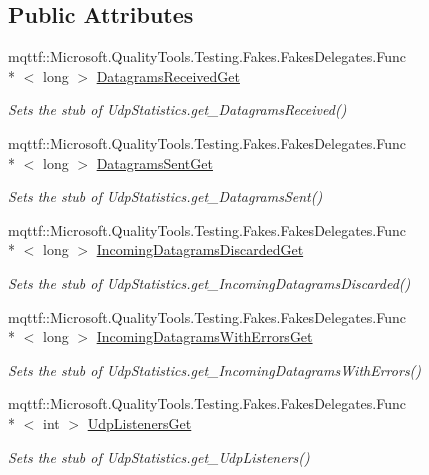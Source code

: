 \subsection*{Public Attributes}
\begin{DoxyCompactItemize}
\item 
mqttf\-::\-Microsoft.\-Quality\-Tools.\-Testing.\-Fakes.\-Fakes\-Delegates.\-Func\\*
$<$ long $>$ \hyperlink{class_system_1_1_net_1_1_network_information_1_1_fakes_1_1_stub_udp_statistics_a74cc53b521e916955921dd58c5bb31ec}{Datagrams\-Received\-Get}
\begin{DoxyCompactList}\small\item\em Sets the stub of Udp\-Statistics.\-get\-\_\-\-Datagrams\-Received()\end{DoxyCompactList}\item 
mqttf\-::\-Microsoft.\-Quality\-Tools.\-Testing.\-Fakes.\-Fakes\-Delegates.\-Func\\*
$<$ long $>$ \hyperlink{class_system_1_1_net_1_1_network_information_1_1_fakes_1_1_stub_udp_statistics_aefa5e5d557004a2c75a0ae493a60ba01}{Datagrams\-Sent\-Get}
\begin{DoxyCompactList}\small\item\em Sets the stub of Udp\-Statistics.\-get\-\_\-\-Datagrams\-Sent()\end{DoxyCompactList}\item 
mqttf\-::\-Microsoft.\-Quality\-Tools.\-Testing.\-Fakes.\-Fakes\-Delegates.\-Func\\*
$<$ long $>$ \hyperlink{class_system_1_1_net_1_1_network_information_1_1_fakes_1_1_stub_udp_statistics_a8885d7648caeada6adc5d91104d1dc21}{Incoming\-Datagrams\-Discarded\-Get}
\begin{DoxyCompactList}\small\item\em Sets the stub of Udp\-Statistics.\-get\-\_\-\-Incoming\-Datagrams\-Discarded()\end{DoxyCompactList}\item 
mqttf\-::\-Microsoft.\-Quality\-Tools.\-Testing.\-Fakes.\-Fakes\-Delegates.\-Func\\*
$<$ long $>$ \hyperlink{class_system_1_1_net_1_1_network_information_1_1_fakes_1_1_stub_udp_statistics_a5fb5e95b1b05270e0657ecd304681187}{Incoming\-Datagrams\-With\-Errors\-Get}
\begin{DoxyCompactList}\small\item\em Sets the stub of Udp\-Statistics.\-get\-\_\-\-Incoming\-Datagrams\-With\-Errors()\end{DoxyCompactList}\item 
mqttf\-::\-Microsoft.\-Quality\-Tools.\-Testing.\-Fakes.\-Fakes\-Delegates.\-Func\\*
$<$ int $>$ \hyperlink{class_system_1_1_net_1_1_network_information_1_1_fakes_1_1_stub_udp_statistics_aefdd8b3f504783342fa1221b7bcd78e5}{Udp\-Listeners\-Get}
\begin{DoxyCompactList}\small\item\em Sets the stub of Udp\-Statistics.\-get\-\_\-\-Udp\-Listeners()\end{DoxyCompactList}\end{DoxyCompactItemize}
